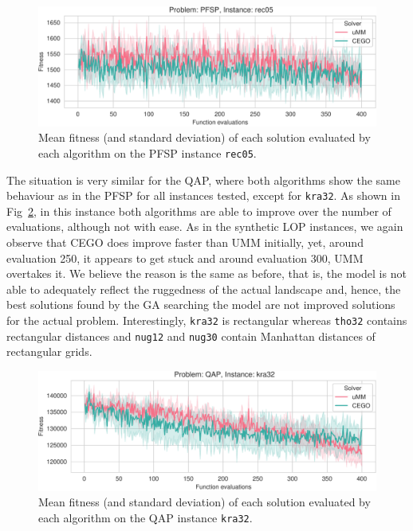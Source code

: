 \documentclass[runningheads]{llncs}
\begin{document}
\begin{figure}[tb]
  \centering%
  \includegraphics[width=\textwidth]{../img/fitness_real_pfsp_rec05_txt}
  \caption{Mean fitness  (and standard deviation)  of each solution evaluated by each algorithm on the PFSP instance \texttt{rec05}.\label{fig:rec05}}
\end{figure}

The situation is very similar for the QAP, where both algorithms show the same
behaviour as in the PFSP for all instances tested, except for
\texttt{kra32}. As shown in Fig~\ref{fig:kra32}, in this instance both
algorithms are able to improve over the number of evaluations, although not
with ease. As in the synthetic LOP instances, we again observe that CEGO does
improve faster than UMM initially, yet, around evaluation 250, it appears to
get stuck and around evaluation 300, UMM overtakes it. We believe the reason is
the same as before, that is, the model is not able to adequately reflect the
ruggedness of the actual landscape and, hence, the best solutions found by the
GA searching the model are not improved solutions for the actual problem. Interestingly, \texttt{kra32} is rectangular
whereas \texttt{tho32} contains rectangular distances and \texttt{nug12} and \texttt{nug30} contain Manhattan distances of rectangular grids.

\begin{figure}[tp]
  \centering%
  \includegraphics[width=\textwidth]{../img/fitness_real_qap_kra32_dat}
    \caption{Mean fitness  (and standard deviation)  of each solution evaluated by each algorithm on the QAP instance \texttt{kra32}.\label{fig:kra32}}
\end{figure}
\end{document}
